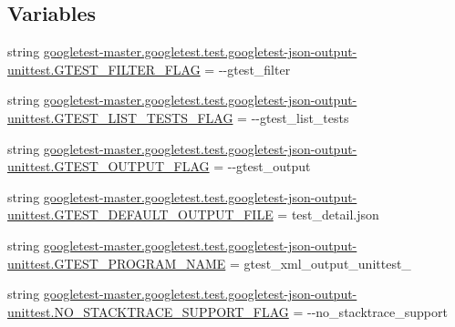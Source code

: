 \subsection*{Variables}
\begin{DoxyCompactItemize}
\item 
string \mbox{\hyperlink{namespacegoogletest-master_1_1googletest_1_1test_1_1googletest-json-output-unittest_ad7ef040e5c95d9ee51f736dbf7402959}{googletest-\/master.\+googletest.\+test.\+googletest-\/json-\/output-\/unittest.\+G\+T\+E\+S\+T\+\_\+\+F\+I\+L\+T\+E\+R\+\_\+\+F\+L\+AG}} = \textquotesingle{}-\/-\/gtest\+\_\+filter\textquotesingle{}
\item 
string \mbox{\hyperlink{namespacegoogletest-master_1_1googletest_1_1test_1_1googletest-json-output-unittest_adcc8031a2699c276ee560e0ee76623c4}{googletest-\/master.\+googletest.\+test.\+googletest-\/json-\/output-\/unittest.\+G\+T\+E\+S\+T\+\_\+\+L\+I\+S\+T\+\_\+\+T\+E\+S\+T\+S\+\_\+\+F\+L\+AG}} = \textquotesingle{}-\/-\/gtest\+\_\+list\+\_\+tests\textquotesingle{}
\item 
string \mbox{\hyperlink{namespacegoogletest-master_1_1googletest_1_1test_1_1googletest-json-output-unittest_a52faa0871539c6ad8503461b63144d21}{googletest-\/master.\+googletest.\+test.\+googletest-\/json-\/output-\/unittest.\+G\+T\+E\+S\+T\+\_\+\+O\+U\+T\+P\+U\+T\+\_\+\+F\+L\+AG}} = \textquotesingle{}-\/-\/gtest\+\_\+output\textquotesingle{}
\item 
string \mbox{\hyperlink{namespacegoogletest-master_1_1googletest_1_1test_1_1googletest-json-output-unittest_ad58ddefb1c8044331f8f4c02f408d155}{googletest-\/master.\+googletest.\+test.\+googletest-\/json-\/output-\/unittest.\+G\+T\+E\+S\+T\+\_\+\+D\+E\+F\+A\+U\+L\+T\+\_\+\+O\+U\+T\+P\+U\+T\+\_\+\+F\+I\+LE}} = \textquotesingle{}test\+\_\+detail.\+json\textquotesingle{}
\item 
string \mbox{\hyperlink{namespacegoogletest-master_1_1googletest_1_1test_1_1googletest-json-output-unittest_a56e69c0056fb25f174fbebad21790879}{googletest-\/master.\+googletest.\+test.\+googletest-\/json-\/output-\/unittest.\+G\+T\+E\+S\+T\+\_\+\+P\+R\+O\+G\+R\+A\+M\+\_\+\+N\+A\+ME}} = \textquotesingle{}gtest\+\_\+xml\+\_\+output\+\_\+unittest\+\_\+\textquotesingle{}
\item 
string \mbox{\hyperlink{namespacegoogletest-master_1_1googletest_1_1test_1_1googletest-json-output-unittest_afc770895691509ff74775d0f1b625e26}{googletest-\/master.\+googletest.\+test.\+googletest-\/json-\/output-\/unittest.\+N\+O\+\_\+\+S\+T\+A\+C\+K\+T\+R\+A\+C\+E\+\_\+\+S\+U\+P\+P\+O\+R\+T\+\_\+\+F\+L\+AG}} = \textquotesingle{}-\/-\/no\+\_\+stacktrace\+\_\+support\textquotesingle{}

\end{DoxyCompactItemize}
